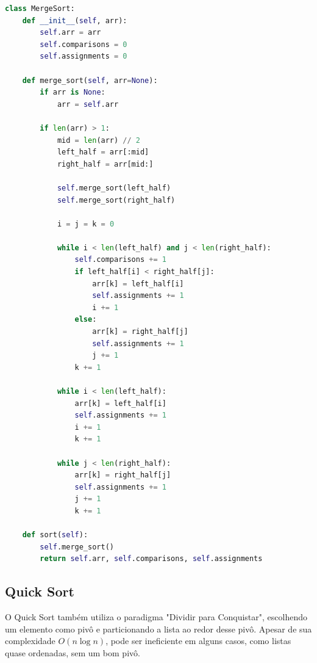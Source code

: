 \documentclass[tcc1,project]{uftex}
\begin{document}
\begin{lstlisting}[language=Python, caption=MergeSort]
class MergeSort:
    def __init__(self, arr):
        self.arr = arr
        self.comparisons = 0
        self.assignments = 0

    def merge_sort(self, arr=None):
        if arr is None:
            arr = self.arr

        if len(arr) > 1:
            mid = len(arr) // 2
            left_half = arr[:mid]
            right_half = arr[mid:]

            self.merge_sort(left_half)
            self.merge_sort(right_half)

            i = j = k = 0

            while i < len(left_half) and j < len(right_half):
                self.comparisons += 1
                if left_half[i] < right_half[j]:
                    arr[k] = left_half[i]
                    self.assignments += 1
                    i += 1
                else:
                    arr[k] = right_half[j]
                    self.assignments += 1
                    j += 1
                k += 1

            while i < len(left_half):
                arr[k] = left_half[i]
                self.assignments += 1
                i += 1
                k += 1

            while j < len(right_half):
                arr[k] = right_half[j]
                self.assignments += 1
                j += 1
                k += 1

    def sort(self):
        self.merge_sort()
        return self.arr, self.comparisons, self.assignments
\end{lstlisting}

\subsection{Quick Sort}
O Quick Sort também utiliza o paradigma "Dividir para Conquistar", escolhendo um elemento como pivô e particionando a lista ao redor desse pivô. Apesar de sua complexidade $O(n \log n)$, pode ser ineficiente em alguns casos, como listas quase ordenadas, sem um bom pivô.
\end{document}
